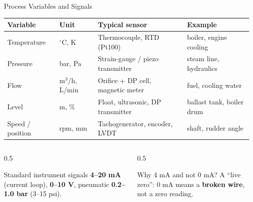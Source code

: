 \documentclass[aspectratio=169]{beamer}
\begin{document}
	\begin{frame}{Process Variables and Signals}
		\renewcommand{\arraystretch}{1.3}
		\centering
		\begin{tabular}{@{}llll@{}}
			\toprule
			\textbf{Variable} & \textbf{Unit} & \textbf{Typical sensor} & \textbf{Example} \\
			\midrule
			Temperature & $^\circ$C, K     & Thermocouple, RTD (Pt100)          & boiler, engine cooling \\
			Pressure    & bar, Pa          & Strain-gauge / piezo transmitter   & steam line, hydraulics \\
			Flow        & m$^3$/h, L/min   & Orifice + DP cell, magnetic meter  & fuel, cooling water \\
			Level       & m, \%            & Float, ultrasonic, DP transmitter  & ballast tank, boiler drum \\
			Speed / position & rpm, mm     & Tachogenerator, encoder, LVDT      & shaft, rudder angle \\
			\bottomrule
		\end{tabular}
		\vspace{0.3cm}
		\begin{columns}[T]
			\begin{column}{0.5\textwidth}
				\begin{block}{Standard instrument signals}
					\small
					\textbf{4--20 mA} (current loop), \textbf{0--10 V}, pneumatic \textbf{0.2--1.0 bar} (3--15 psi).
				\end{block}
			\end{column}
			\begin{column}{0.5\textwidth}
				\begin{block}{Why 4 mA and not 0 mA?}
					\small A ``live zero'': 0 mA means a \textbf{broken wire}, not a zero reading.
				\end{block}
			\end{column}
		\end{columns}
	\end{frame}
\end{document}
